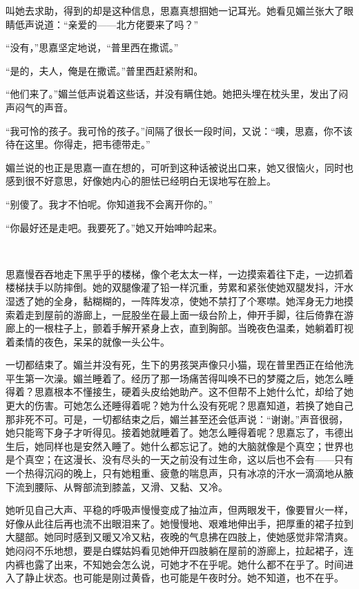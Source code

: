 \par 叫她去求助，得到的却是这种信息，思嘉真想掴她一记耳光。她看见媚兰张大了眼睛低声说道：“亲爱的——北方佬要来了吗？”
\par “没有，”思嘉坚定地说，“普里西在撒谎。”
\par “是的，夫人，俺是在撒谎。”普里西赶紧附和。
\par “他们来了。”媚兰低声说着这些话，并没有瞒住她。她把头埋在枕头里，发出了闷声闷气的声音。
\par “我可怜的孩子。我可怜的孩子。”间隔了很长一段时间，又说：“噢，思嘉，你不该待在这里。你得走，把韦德带走。”
\par 媚兰说的也正是思嘉一直在想的，可听到这种话被说出口来，她又很恼火，同时也感到很不好意思，好像她内心的胆怯已经明白无误地写在脸上。
\par “别傻了。我才不怕呢。你知道我不会离开你的。”
\par “你最好还是走吧。我要死了。”她又开始呻吟起来。
\par  
\par 思嘉慢吞吞地走下黑乎乎的楼梯，像个老太太一样，一边摸索着往下走，一边抓着楼梯扶手以防摔倒。她的双腿像灌了铅一样沉重，劳累和紧张使她双腿发抖，汗水湿透了她的全身，黏糊糊的，一阵阵发凉，使她不禁打了个寒噤。她浑身无力地摸索着走到屋前的游廊上，一屁股坐在最上面一级台阶上，伸开手脚，往后倚靠在游廊上的一根柱子上，颤着手解开紧身上衣，直到胸部。当晚夜色温柔，她躺着盯视着柔情的夜色，呆呆的就像一头公牛。
\par 一切都结束了。媚兰并没有死，生下的男孩哭声像只小猫，现在普里西正在给他洗平生第一次澡。媚兰睡着了。经历了那一场痛苦得叫唤不已的梦魇之后，她怎么睡得着？思嘉根本不懂接生，硬着头皮给她助产。这不但帮不上她什么忙，却给了她更大的伤害。可她怎么还睡得着呢？她为什么没有死呢？思嘉知道，若换了她自己那非死不可。可是，一切都结束之后，媚兰甚至还会低声说：“谢谢。”声音很弱，她只能弯下身子才听得见。接着她就睡着了。她怎么睡得着呢？思嘉忘了，韦德出生后，她同样也是安然入睡了。她什么都忘记了。她的大脑就像是个真空；世界也是个真空；在这漫长、没有尽头的一天之前没有过生命，这以后也不会有——只有一个热得沉闷的晚上，只有她粗重、疲惫的喘息声，只有冰凉的汗水一滴滴地从腋下流到腰际、从臀部流到膝盖，又滑、又黏、又冷。
\par 她听见自己大声、平稳的呼吸声慢慢变成了抽泣声，但两眼发干，像要冒火一样，好像从此往后再也流不出眼泪来了。她慢慢地、艰难地伸出手，把厚重的裙子拉到大腿部。她同时感到又暖又冷又粘，夜晚的气息拂在四肢上，使她感觉非常清爽。她闷闷不乐地想，要是白蝶姑妈看见她伸开四肢躺在屋前的游廊上，拉起裙子，连内裤也露了出来，不知她会怎么说，可她才不在乎呢。她什么都不在乎了。时间进入了静止状态。也可能是刚过黄昏，也可能是午夜时分。她不知道，也不在乎。
